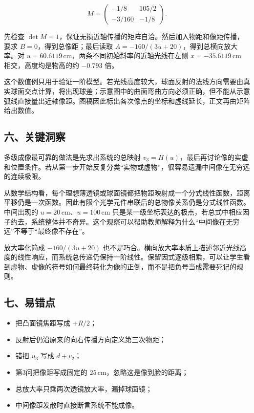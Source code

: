 \documentclass[12pt,a4paper,UTF8]{ctexart}
\newcommand{\tightlist}{\setlength{\itemsep}{0pt}\setlength{\parskip}{0pt}}
\begin{document}
\[M=\begin{pmatrix}-1/8&105/2\\-3/160&-1/8\end{pmatrix}.\]

先检查
\(\det M=1\)，保证无损近轴传播的矩阵自洽。然后加入物距和像距传播，要求
\(B=0\)，得到总像距；最后读取 \(A=-160/(3u+20)\)，得到总横向放大率。对
\(u=60.6119\,\mathrm{cm}\)，两条不同初始斜率的近轴光线在左侧
\(x=-35.6119\,\mathrm{cm}\) 相交，高度均是物高的约 \(-0.793\) 倍。

这个数值例只用于验证一阶模型。若光线高度较大，球面反射的法线方向需要由真实球面交点计算，将出现球差；示意图中的曲面弯曲方向必须正确，但不能从示意弧线直接量出近轴像距。图稿因此标出各次像点的坐标和虚线延长，正文再由矩阵给出数值。

\subsection{六、关键洞察}\label{ux516dux5173ux952eux6d1eux5bdf-1}

多级成像最可靠的做法是先求出系统的总映射
\(v_3=H(u)\)，最后再讨论像的实虚和位置条件。若从第一步开始反复分类``实物或虚物''，很容易遗漏中间像在无穷远的连续极限。

从数学结构看，每个理想薄透镜或球面镜都把物距映射成一个分式线性函数，距离平移仍是一次函数。因此有限个光学元件串联后的总物像关系仍是分式线性函数。中间出现的
\(u=20\,\mathrm{cm}\)、\(u=100\,\mathrm{cm}\)
只是某一级坐标表达的极点，若总式中相应因子约去，系统整体并不奇异。这个观察可以帮助教师解释为什么``中间像在无穷远''不等于``最终像不存在''。

放大率化简成 \(-160/(3u+20)\)
也不是巧合。横向放大率本质上描述邻近光线高度的线性响应，而系统总传递仍保持一阶线性。保留因式逐级相乘，可以让学生看到虚物、虚像的符号如何最终转化为像的正倒，而不是把负号当成需要死记的规则。

\subsection{七、易错点}\label{ux4e03ux6613ux9519ux70b9-1}

\begin{itemize}
\tightlist
\item
  把凸面镜焦距写成 \(+R/2\)；
\item
  反射后仍沿原来的向右传播方向定义第三次物距；
\item
  错把 \(u_3\) 写成 \(d+v_2\)；
\item
  第3问把像距写成固定的 \(25\,\mathrm{cm}\)，忽略这是像到脸的距离；
\item
  总放大率只乘两次透镜放大率，漏掉球面镜；
\item
  中间像距发散时直接断言系统不能成像。
\end{itemize}
\end{document}

